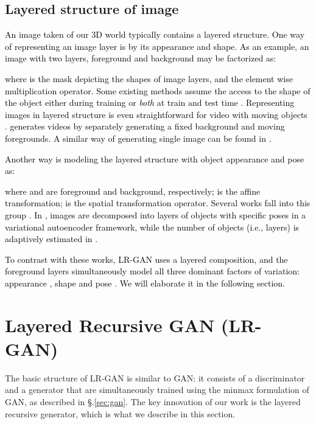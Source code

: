 \documentclass{article} \usepackage{iclr2017_conference,times}
\begin{document}
\subsection{Layered structure of image}
\label{sec:layer}
\textcolor{black}{An image taken of our 3D world typically contains a layered structure. One way of representing an image layer is by its appearance and shape. As an example, an image  with two layers, foreground  and background  may be factorized as:

where  is the mask depicting the shapes of image layers, and  the element wise multiplication operator. Some existing methods assume the access to the shape of the object either during training \citep{isola2013scene} or \emph{both} at train and test time \citep{WWGAN,YanYSL15}. Representing images in layered structure is even straightforward for video with moving objects \citep{TP16, WA94, KJF05}. \cite{VideoGAN} generates videos by separately generating a fixed background and moving foregrounds. A similar way of generating single image can be found in \cite{CompositeGAN}.}

\textcolor{black}{Another way is modeling the layered structure with object appearance and pose as:

where  and  are foreground and background, respectively;  is the affine transformation;  is the spatial transformation operator. Several works fall into this group \citep{RHS+11, HM15, EHWTKH16}. In \cite{HM15}, images are decomposed into layers of objects with specific poses in a variational autoencoder framework, while the number of objects (i.e., layers) is adaptively estimated in \cite{EHWTKH16}.}

\textcolor{black}{To contrast with these works, LR-GAN uses a layered composition, and the foreground layers simultaneously model all three dominant factors of variation: appearance , shape  and pose . We will elaborate it in the following section.}








\section{Layered  Recursive GAN (LR-GAN)} 
\label{sec:model}
\vspace{-5pt}
The basic structure of LR-GAN is similar to GAN: it consists of a discriminator and a generator that are simultaneously trained using the minmax formulation of GAN, as described in \S.\ref{sec:gan}. The key innovation of our work is the layered recursive generator, which is what we describe in this section. 
\end{document}
